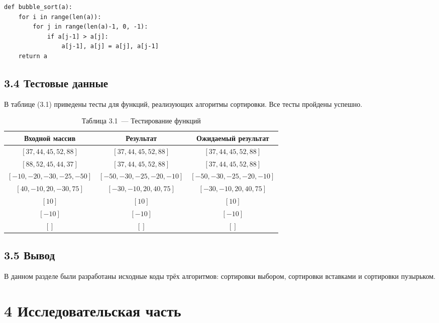 \documentclass[12pt, a4paper]{report}
\begin{document}
\begin{lstlisting}[title=Листинг 3.3~--- Сортировка пузырьком]
def bubble_sort(a):
    for i in range(len(a)):
        for j in range(len(a)-1, 0, -1):
            if a[j-1] > a[j]:
                a[j-1], a[j] = a[j], a[j-1]
    return a
\end{lstlisting}

\section*{3.4 Тестовые данные}

В таблице (3.1) приведены тесты для функций, реализующих алгоритмы сортировки. Все тесты пройдены успешно.

\begin{table}[h]
	\caption*{Таблица 3.1~--- Тестирование функций}
		\begin{tabular}[l]{|c|c|c|}
			\hline
			Входной массив & Результат & Ожидаемый результат \\ 
			\hline
			$[37, 44, 45, 52, 88]$ & $[37, 44, 45, 52, 88]$  & $[37, 44, 45, 52, 88]$\\\hline
			$[88, 52, 45, 44, 37]$  & $[37, 44, 45, 52, 88]$ & $[37, 44, 45, 52, 88]$\\\hline
			$[-10, -20, -30, -25, -50]$  & $[-50, -30, -25, -20, -10]$  & $[-50, -30, -25, -20, -10]$\\\hline
			$[40, -10, 20, -30, 75]$  & $[-30, -10, 20, 40, 75]$  & $[-30, -10, 20, 40, 75]$\\\hline
			$[10]$  & $[10]$  & $[10]$\\\hline
			$[-10]$  & $[-10]$  & $[-10]$\\\hline
			$[]$  & $[]$  & $[]$\\
			\hline
		\end{tabular}
\end{table}

\section*{3.5 Вывод}

В данном разделе были разработаны исходные коды трёх алгоритмов: сортировки выбором, сортировки вставками и сортировки пузырьком.

\chapter*{4 Исследовательская часть}
\end{document}
